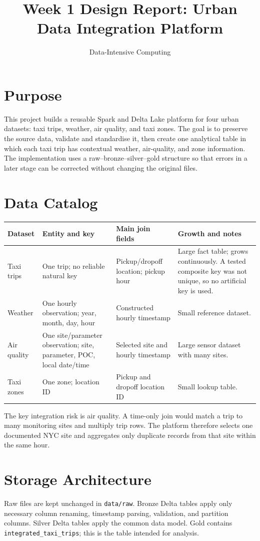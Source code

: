 \documentclass[11pt]{article}
\title{Week 1 Design Report: Urban Data Integration Platform}
\author{Data-Intensive Computing}
\date{}
\begin{document}
\maketitle

\section{Purpose}
This project builds a reusable Spark and Delta Lake platform for four urban datasets: taxi trips, weather, air quality, and taxi zones. The goal is to preserve the source data, validate and standardise it, then create one analytical table in which each taxi trip has contextual weather, air-quality, and zone information. The implementation uses a raw--bronze--silver--gold structure so that errors in a later stage can be corrected without changing the original files.

\section{Data Catalog}
\begin{center}
\small
\begin{tabular}{p{2.2cm}p{2.7cm}p{3.0cm}p{2.8cm}}
\toprule
Dataset & Entity and key & Main join fields & Growth and notes \\
\midrule
Taxi trips & One trip; no reliable natural key & Pickup/dropoff location; pickup hour & Large fact table; grows continuously. A tested composite key was not unique, so no artificial key is used. \\
Weather & One hourly observation; year, month, day, hour & Constructed hourly timestamp & Small reference dataset. \\
Air quality & One site/parameter observation; site, parameter, POC, local date/time & Selected site and hourly timestamp & Large sensor dataset with many sites. \\
Taxi zones & One zone; location ID & Pickup and dropoff location ID & Small lookup table. \\
\bottomrule
\end{tabular}
\end{center}

The key integration risk is air quality. A time-only join would match a trip to many monitoring sites and multiply trip rows. The platform therefore selects one documented NYC site and aggregates only duplicate records from that site within the same hour.

\section{Storage Architecture}
Raw files are kept unchanged in \texttt{data/raw}. Bronze Delta tables apply only necessary column renaming, timestamp parsing, validation, and partition columns. Silver Delta tables apply the common data model. Gold contains \texttt{integrated\_taxi\_trips}; this is the table intended for analysis.
\end{document}
